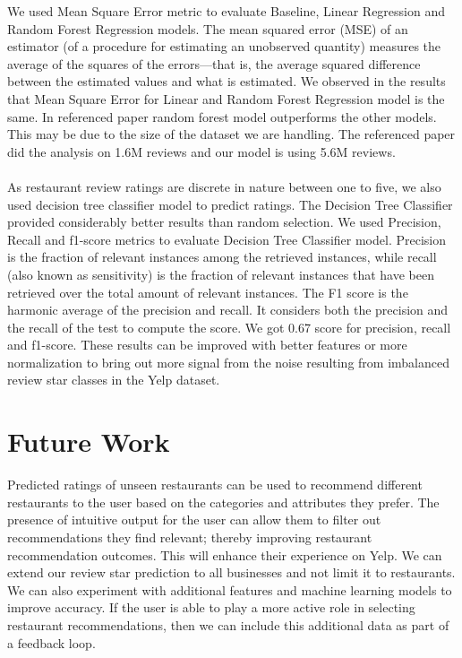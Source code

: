 \documentclass[12pt]{article}
\begin{document}
We used Mean Square Error metric to evaluate Baseline, Linear Regression and Random Forest Regression models. 
The mean squared error (MSE) of an estimator (of a procedure for estimating an unobserved quantity) measures the average of the squares of the errors—that is, the average squared difference between the estimated values and what is estimated. 
We observed in the results that Mean Square Error for Linear and Random Forest Regression
model is the same. In referenced paper random forest model outperforms the other models. This may
be due to the size of the dataset we are handling. The referenced paper did the analysis on 1.6M
reviews and our model is using 5.6M reviews. \\ \\
As restaurant review ratings are discrete in nature
between one to five, we also used decision tree classifier model to predict ratings. The
Decision Tree Classifier provided considerably better results than random selection. 
We used Precision, Recall and f1-score metrics to evaluate Decision Tree Classifier model. 
Precision is the fraction of relevant instances among the retrieved instances, while recall (also known as sensitivity) is the fraction of relevant instances that have been retrieved over the total amount of relevant instances. The F1 score is the harmonic average of the precision and recall. It considers both the precision and the recall of the test to compute the score. 
We got 0.67 score for precision, recall and f1-score. 
These
results can be improved with better features or more normalization to bring out more signal
from the noise resulting from imbalanced review star classes in the Yelp dataset.

\section{Future Work}

Predicted ratings of unseen restaurants can be used to recommend different restaurants to the
user based on the categories and attributes they prefer. The presence of intuitive output for
the user can allow them to filter out recommendations they find relevant; thereby improving
restaurant recommendation outcomes. This will enhance their experience on Yelp. We can extend
our review star prediction to all businesses and not limit it to restaurants. We can also
experiment with additional features and machine learning models to improve accuracy. If the
user is able to play a more active role in selecting restaurant recommendations, then we can
include this additional data as part of a feedback loop.
\end{document}
